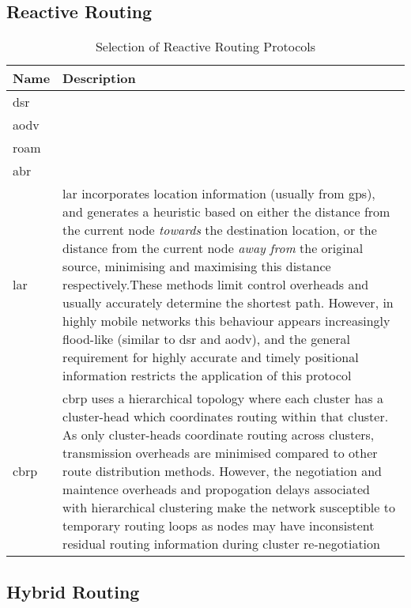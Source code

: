 \subsection{Reactive Routing}


\begin{table}\centering
  \caption[Selection of Reactive Routing Protocols]{Selection of Reactive Routing Protocols}
  \label{tab:reactive_routing_protocols}
  \begin{tabularx}{\textwidth}{p{1.25cm}|X}\toprule
    Name & Description \\ \midrule
    \gls{dsr} & \\
    \gls{aodv} & \\
    \gls{roam} & \\
    \gls{abr} & \\
    \gls{lar} & \acrlong{lar} incorporates location information (usually from \gls{gps}), and generates a heuristic based on either the distance from the current node \emph{towards} the destination location, or the distance from the current node \emph{away from} the original source, minimising and maximising this distance respectively.These methods limit control overheads and usually accurately determine the shortest path. However, in highly mobile networks this behaviour appears increasingly flood-like (similar to \gls{dsr} and \gls{aodv}), and the general requirement for highly accurate and timely positional information restricts the application of this protocol\\
    \gls{cbrp} & \acrlong{cbrp} uses a hierarchical topology where each cluster has a cluster-head which coordinates routing within that cluster. As only cluster-heads coordinate routing across clusters, transmission overheads are minimised compared to other route distribution methods. However, the negotiation and maintence overheads and propogation delays associated with hierarchical clustering make the network susceptible to temporary routing loops as nodes may have inconsistent residual routing information during cluster re-negotiation\\
    
    \bottomrule
  \end{tabularx}
\end{table}

\subsection{Hybrid Routing}

